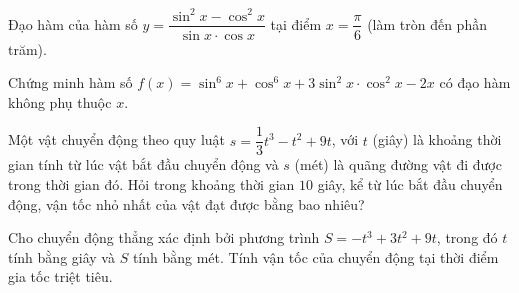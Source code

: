 \begin{ex}%
Đạo hàm của hàm số $y=\dfrac{\sin ^2 x-\cos ^2 x}{\sin x\cdot\cos x}$ tại điểm $x=\dfrac{\pi}{6}$ (làm tròn đến phần trăm).
\end{ex}

\begin{ex}%
Chứng minh hàm số $f(x)=\sin ^6 x+\cos ^6 x+3\sin ^2 x\cdot\cos ^2 x-2 x$ có đạo hàm không phụ thuộc $x$.\\
\end{ex}

\begin{ex}%
Một vật chuyển động theo quy luật $s=\dfrac{1}{3}t^3-t^2+9 t$, với $t$ (giây) là khoảng thời gian tính từ lúc vật bắt đầu chuyển động và $s$ (mét) là quãng đường vật đi được trong thời gian đó. Hỏi trong khoảng thời gian $10$ giây, kể từ lúc bắt đầu chuyển động, vận tốc nhỏ nhất của vật đạt được bằng bao nhiêu?\\
\end{ex}

\begin{ex}%
Cho chuyển động thẳng xác định bởi phương trình $S=-t^3+3 t^2+9 t$, trong đó $t$ tính bằng giây và $S$ tính bằng mét. Tính vận tốc của chuyển động tại thời điểm gia tốc triệt tiêu.\\
\end{ex}



